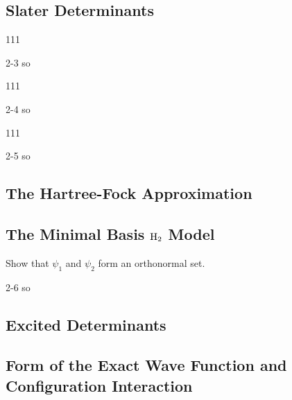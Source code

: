 \documentclass[a4paper]{book}
\begin{document}
	\subsection{Slater Determinants}
	
	\begin{exercise}
	111
	\end{exercise}
	
	\begin{solution}
		2-3 so
	\end{solution}

	\begin{exercise}
	111
	\end{exercise}
	
	\begin{solution}
		2-4 so
	\end{solution}
	
	\begin{exercise}
	111
	\end{exercise}
	
	\begin{solution}
		2-5 so
	\end{solution}
	
	\subsection{The Hartree-Fock Approximation}
	
	\subsection{The Minimal Basis \texorpdfstring{$\ce{H2}$}- Model}
	
	\begin{exercise}
	Show that $\psi_1$ and $\psi_2$ form an orthonormal set.
	\end{exercise}
	
	\begin{solution}
		2-6 so
	\end{solution}
	
	\subsection{Excited Determinants}
	
	\subsection{Form of the Exact Wave Function and Configuration Interaction}
	
\end{document}

